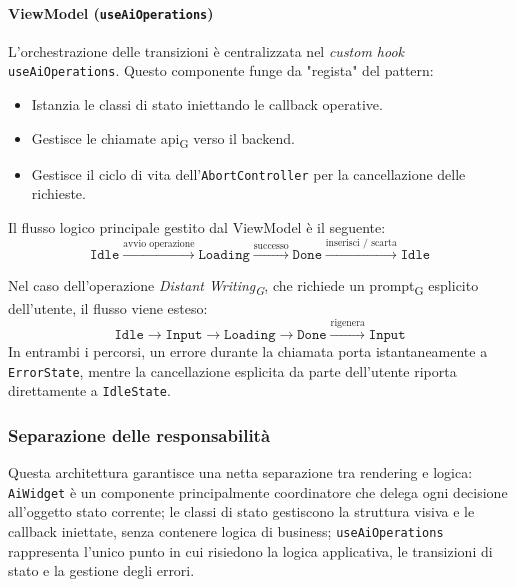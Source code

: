 \documentclass[11pt,a4paper]{article}
\newcommand{\gls}[1]{#1\textsubscript{G}}
\begin{document}
\paragraph{ViewModel (\texttt{useAiOperations})}
L'orchestrazione delle transizioni è centralizzata nel \textit{custom hook} \texttt{useAiOperations}. Questo componente funge da "regista" del pattern:
\begin{itemize}
    \item Istanzia le classi di stato iniettando le callback operative.
    \item Gestisce le chiamate \gls{api} verso il backend.
    \item Gestisce il ciclo di vita dell'\texttt{AbortController} per la cancellazione delle richieste.
\end{itemize}

Il flusso logico principale gestito dal ViewModel è il seguente:
\begin{equation*}
\texttt{Idle} \xrightarrow{\text{avvio operazione}} \texttt{Loading} \xrightarrow{\text{successo}} \texttt{Done} \xrightarrow{\text{inserisci / scarta}} \texttt{Idle}
\end{equation*}

Nel caso dell'operazione \textit{\gls{Distant Writing}}, che richiede un \gls{prompt} esplicito dell'utente, il flusso viene esteso:
\begin{equation*}
\texttt{Idle} \to \texttt{Input} \to \texttt{Loading} \to \texttt{Done} \xrightarrow{\text{rigenera}} \texttt{Input}
\end{equation*}
In entrambi i percorsi, un errore durante la chiamata porta istantaneamente a \texttt{ErrorState}, mentre la cancellazione esplicita da parte dell'utente riporta direttamente a \texttt{IdleState}.

\subsubsection{Separazione delle responsabilità}
Questa architettura garantisce una netta separazione tra rendering e logica: \texttt{AiWidget} è un componente principalmente coordinatore che delega ogni decisione all’oggetto stato corrente; le classi di stato gestiscono la struttura visiva e le callback iniettate, senza contenere logica di business; \texttt{useAiOperations} rappresenta l’unico punto in cui risiedono la logica applicativa, le transizioni di stato e la gestione degli errori.


\newpage
\end{document}
